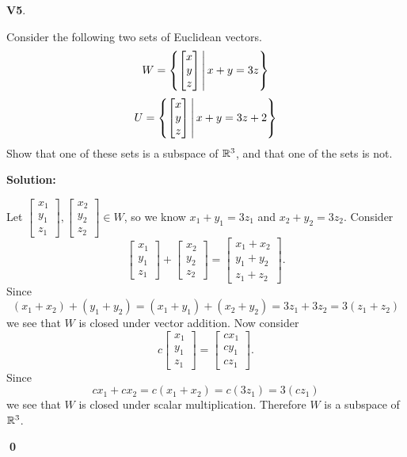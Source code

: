\documentclass{article}
\newenvironment{problem}[1]
{
	\begin{flushleft}
	\textbf{#1}.
	\ignorespaces
}
{
	\end{flushleft}
}
\newenvironment{solution}
{
	\ignorespaces
	\textbf{Solution:}
}
{
	\ignorespacesafterend
	\begin{flushright}
	{\bfseries \qed}
	\end{flushright}
}
\begin{document}
\begin{problem}{V5}
Consider the following two sets of Euclidean vectors.
\[
	W = \left\{\begin{bmatrix} x \\ y \\ z \end{bmatrix}\,\middle|\,x+y=3z\right\}
\]
\[
	U = \left\{\begin{bmatrix} x \\ y \\ z \end{bmatrix}\,\middle|\,x+y=3z+2\right\}
\]
Show that one of these sets is a subspace of \(\mathbb{R}^3\), and
that one of the sets is not.
\end{problem}
\begin{solution}
Let
\(
	\begin{bmatrix} x_1 \\y_1 \\ z_1 \end{bmatrix},
	\begin{bmatrix} x_2 \\y_2 \\ z_2 \end{bmatrix} \in W
\),
so we know \(x_1+y_1=3z_1\) and \(x_2+y_2=3z_2\).
Consider
\[
\begin{bmatrix} x_1 \\y_1 \\ z_1 \end{bmatrix}
+\begin{bmatrix} x_2 \\y_2 \\ z_2 \end{bmatrix}
=\begin{bmatrix} x_1+x_2 \\y_1+y_2 \\ z_1+z_2 \end{bmatrix}
.\]
Since
\[
	(x_1+x_2)+(y_1+y_2) = (x_1+y_1)+(x_2+y_2) = 3z_1+3z_2=3(z_1+z_2)
\]
we see that \(W\) is closed under vector addition.
Now consider
\[
c\begin{bmatrix} x_1 \\y_1 \\ z_1 \end{bmatrix}
=\begin{bmatrix} cx_1 \\cy_1 \\ cz_1 \end{bmatrix}
.\]
Since
\[cx_1+cx_2 = c(x_1+x_2)=c(3z_1)=3(cz_1)\]
we see that \(W\) is closed under scalar multiplication. Therefore \(W\)
is a subspace of \(\mathbb{R}^3\).


\end{solution}
\end{document}
